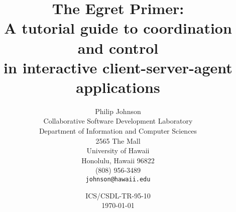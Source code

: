 


\pagestyle{headings}
\makeindex

\newcommand{\exercise}[4]
   {\addtocounter{exercise}{1}\par\medskip\noindent{\bf Exercise \theexercise: #1}%
   \hfill{\em #2 minutes, #3 LOC}\hfill #4 \par\noindent}

\newcommand{\primersummary}[4]
   {\begin{figure}[h]
    \horizontalline \newline
    \noindent {\em Class Name:} #1 \newline
    \noindent {\em Purpose:} #2 \newline
    \noindent {\em Focal ECS facilities:} #3 \newline
    \noindent {\em Related Primer Material:} #4 \newline
    \horizontalline
    \end{figure}
    }



\title{{\Large\bf The Egret Primer:}\\
       {\Large A tutorial guide to coordination and control \\
               in interactive client-server-agent applications}}


\author{Philip Johnson\\ 
        Collaborative Software Development Laboratory\\
        Department of Information and Computer Sciences\\ 
        2565 The Mall\\ 
        University of Hawaii\\ 
        Honolulu, Hawaii 96822\\ 
        (808) 956-3489\\
        {\tt johnson@hawaii.edu}}

\date{ICS/CSDL-TR-95-10\\\today\\}

\maketitle

\newpage
\tableofcontents
\newpage







\appendix





